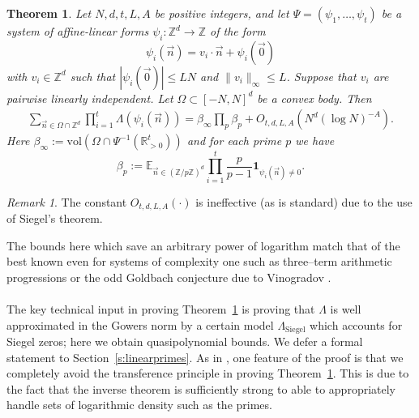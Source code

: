 \documentclass[11pt, a4paper]{amsart}
\theoremstyle{plain}
\theoremstyle{plain}
\newtheorem{theorem}{Theorem}
\theoremstyle{definition}
\theoremstyle{remark}
\newtheorem*{remark}{Remark}
\numberwithin{equation}{section}
\numberwithin{lemma}{section}
\numberwithin{proposition}{section}
\numberwithin{corollary}{section}
\numberwithin{definition}{section}
\numberwithin{claim}{section}
\begin{document}
\begin{theorem}\label{t:quantthm}
Let $N,d,t,L,A$ be positive integers, and let $\Psi = (\psi_1,\dots,\psi_t)$ be a system of affine-linear forms $\psi_i \colon \mathbb{Z}^d \to \mathbb{Z}$ of the form 
\[\psi_i(\vec{n}) = v_i\cdot \vec{n} + \psi_i(\vec{0})\]
with $v_i\in \mathbb{Z}^d$ such that $|\psi_i(\vec{0})|\le LN$ and $\|v_i\|_{\infty}\le L$. Suppose that $v_i$ are pairwise linearly independent. Let $\Omega\subset [-N,N]^d$ be a convex body. Then 
\begin{align}\label{e:count}
\sum_{\vec{n}\in \Omega\cap \mathbb{Z}^d} \prod_{i=1}^{t}\Lambda(\psi_i(\vec{n})) = \beta_\infty \prod_p \beta_p + O_{t,d,L,A}(N^d (\log N)^{-A}).
\end{align}
Here $\beta_{\infty} := \mathrm{vol}(\Omega\cap \Psi^{-1}(\mathbb{R}_{>0}^{t}))$ and for each prime $p$ we have 
\[\beta_p := \mathbb{E}_{\vec{n}\in (\mathbb{Z}/p\mathbb{Z})^d} \prod_{i=1}^t \frac{p}{p-1} \mathbf{1}_{\psi_i(\vec n) \neq 0}.\]
\end{theorem}
\begin{remark}
The constant $O_{t,d,L,A}(\cdot)$ is ineffective (as is standard) due to the use of Siegel's theorem.  
\end{remark}

The bounds here which save an arbitrary power of logarithm match that of the best known even for systems of complexity one such as three--term arithmetic progressions or the odd Goldbach conjecture due to Vinogradov \cite{Vin37}. \\\\
The key technical input in proving Theorem~\ref{t:quantthm} is proving that $\Lambda$ is well approximated in the Gowers norm by a certain model $\Lambda_{\mathrm{Siegel}}$ which accounts for Siegel zeros; here we obtain quasipolynomial bounds. We defer a formal statement to Section~\ref{s:linearprimes}. As in \cite{Len22b}, one feature of the proof is that we completely avoid the transference principle in proving Theorem~\ref{t:quantthm}. This is due to the fact that the inverse theorem is sufficiently strong to able to appropriately handle sets of logarithmic density such as the primes.
\end{document}
